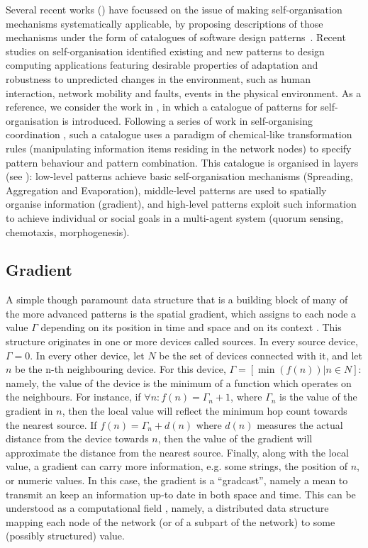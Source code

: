 \documentclass[12pt,a4paper,twoside,openright]{book}
\begin{document}
Several recent works (\cite{FDMVA-NACO2012,GVO-CEEMAS2007,Mam06,Wolf2007}) have focussed on the issue of making self-organisation mechanisms systematically applicable, by proposing descriptions of those mechanisms under the form of catalogues of software design patterns~\cite{Gamma1995}.
%
Recent studies on self-organisation identified existing and new patterns to design computing applications featuring desirable properties of adaptation and robustness to unpredicted changes in the environment, such as human interaction, network mobility and faults, events in the physical environment.
%
As a reference, we consider the work in \cite{FDMVA-NACO2012}, in which a catalogue of patterns for self-organisation is introduced.
%
Following a series of work in self-organising coordination \cite{VCMZ-TAAS2011,sapereecolaws-sac2012}, such a catalogue uses a paradigm of chemical-like transformation rules (manipulating information items residing in the network nodes) to specify pattern behaviour and pattern combination.
%
This catalogue is organised in layers (see ): low-level patterns achieve basic self-organisation mechanisms (Spreading, Aggregation and Evaporation), middle-level patterns are used to spatially organise information (gradient), and high-level patterns exploit such information to achieve individual or social goals in a multi-agent system (quorum sensing, chemotaxis, morphogenesis).

\subsection{Gradient}
\label{gradient}
A simple though paramount data structure that is a building block of many of the more advanced patterns is the spatial gradient, which assigns to each node a value $\varGamma$ depending on its position in time and space and on its context \cite{mamei2009acm,crf,VCMZ-TAAS2011}.
%
This structure originates in one or more devices called sources.
%
In every source device, $\varGamma=0$.
%
In every other device, let $N$ be the set of devices connected with it, and let $n$ be the n-th neighbouring device.
%
For this device, $\varGamma=[\min(f(n)) | n \in N]$: namely, the value of the device is the minimum of a function which operates on the neighbours.
%
For instance, if $ \forall n \colon f(n)=\varGamma_{n}+1$, where $\varGamma_{n}$ is the value of the gradient in $n$, then the local value will reflect the minimum hop count towards the nearest source.
%
If $f(n) = \varGamma_{n} +d(n)$ where $d(n)$ measures the actual distance from the device towards $n$, then the value of the gradient will approximate the distance from the nearest source.
%
Finally, along with the local value, a gradient can carry more information, e.g. some strings, the position of $n$, or numeric values.
%
In this case, the gradient is a ``gradcast'', namely a mean to transmit an keep an information up-to date in both space and time.
%
This can be understood as a computational field \cite{SpatialIGI2013,mamei2009acm,VCMZ-TAAS2011}, namely, a distributed data structure mapping each node of the network (or of a subpart of the network) to some (possibly structured) value.
\end{document}
